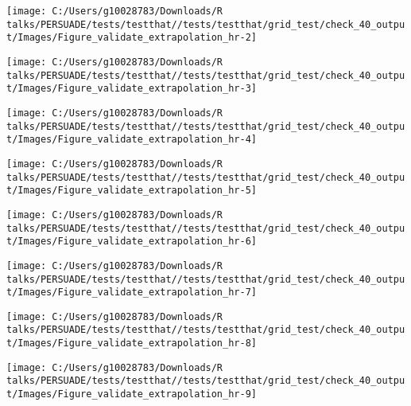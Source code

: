 \documentclass[
]{article}
\begin{document}
\begin{flushleft}\texttt{[image: C:/Users/g10028783/Downloads/R talks/PERSUADE/tests/testthat//tests/testthat/grid\_test/check\_40\_output/Images/Figure\_validate\_extrapolation\_hr-2]} \end{flushleft}

\begin{flushleft}\texttt{[image: C:/Users/g10028783/Downloads/R talks/PERSUADE/tests/testthat//tests/testthat/grid\_test/check\_40\_output/Images/Figure\_validate\_extrapolation\_hr-3]} \end{flushleft}

\begin{flushleft}\texttt{[image: C:/Users/g10028783/Downloads/R talks/PERSUADE/tests/testthat//tests/testthat/grid\_test/check\_40\_output/Images/Figure\_validate\_extrapolation\_hr-4]} \end{flushleft}

\begin{flushleft}\texttt{[image: C:/Users/g10028783/Downloads/R talks/PERSUADE/tests/testthat//tests/testthat/grid\_test/check\_40\_output/Images/Figure\_validate\_extrapolation\_hr-5]} \end{flushleft}

\begin{flushleft}\texttt{[image: C:/Users/g10028783/Downloads/R talks/PERSUADE/tests/testthat//tests/testthat/grid\_test/check\_40\_output/Images/Figure\_validate\_extrapolation\_hr-6]} \end{flushleft}

\begin{flushleft}\texttt{[image: C:/Users/g10028783/Downloads/R talks/PERSUADE/tests/testthat//tests/testthat/grid\_test/check\_40\_output/Images/Figure\_validate\_extrapolation\_hr-7]} \end{flushleft}

\begin{flushleft}\texttt{[image: C:/Users/g10028783/Downloads/R talks/PERSUADE/tests/testthat//tests/testthat/grid\_test/check\_40\_output/Images/Figure\_validate\_extrapolation\_hr-8]} \end{flushleft}

\begin{flushleft}\texttt{[image: C:/Users/g10028783/Downloads/R talks/PERSUADE/tests/testthat//tests/testthat/grid\_test/check\_40\_output/Images/Figure\_validate\_extrapolation\_hr-9]} \end{flushleft}
\end{document}
